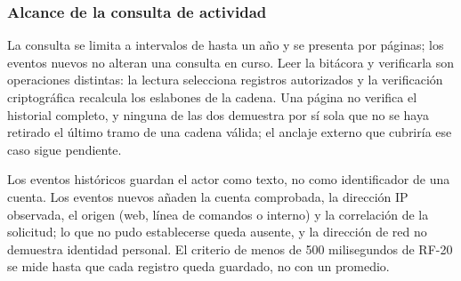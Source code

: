 \subsubsection{Alcance de la consulta de actividad}\label{sec:diseno-bitacora}

La consulta se limita a intervalos de hasta un año y se presenta por páginas;
los eventos nuevos no alteran una consulta en curso. Leer la bitácora y
verificarla son operaciones distintas: la lectura selecciona registros
autorizados y la verificación criptográfica recalcula los eslabones de la
cadena. Una página no verifica el historial completo, y ninguna de las dos
demuestra por sí sola que no se haya retirado el último tramo de una cadena
válida; el anclaje externo que cubriría ese caso sigue pendiente.

Los eventos históricos guardan el actor como texto, no como identificador de
una cuenta. Los eventos nuevos añaden la cuenta comprobada, la dirección IP
observada, el origen (web, línea de comandos o interno) y la correlación de la
solicitud; lo que no pudo establecerse queda ausente, y la dirección de red no
demuestra identidad personal. El criterio de menos de 500 milisegundos de
RF-20 se mide hasta que cada registro queda guardado, no con un promedio.
